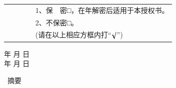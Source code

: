 {{            \vspace*{1cm}
            \begin{center}\hei\xiaoer{\@authorizedtitle}\end{center}\par
            \vspace{1.2\baselineskip}
            \song{}\par
            \song{}\par
            \begin{tabular}{lll}
                \qquad\qquad& \qquad\quad\qquad&\ \ \ \ 1、保　密□，在\underline{\qquad\qquad}年解密后适用于本授权书。 \\
                \qquad\qquad& \qquad\quad\qquad&\ \ \ \ 2、不保密□。                                       \\
                \qquad\qquad& \qquad\quad\qquad&\ \ \ \ (请在以上相应方框内打``$\surd$'')
            \end{tabular}
            \par
            \vspace{2\baselineskip}
            \song\xiaosi
            \@studentsign \makebox[3cm][s]{} \qquad\qquad  
            \makebox[0.5cm][s]{} 年 \makebox[0.5cm][s]{} 月 \makebox[0.5cm][s]{} 日 \\
            \indent
            \@teachersign \makebox[3cm][s]{} \qquad\qquad  
            \makebox[0.5cm][s]{} 年 \makebox[0.5cm][s]{} 月 \makebox[0.5cm][s]{} 日
        }
        \clearpage

         {
            \begin{center}
                \hei\xiaoer{\@title}
            \end{center}\par
            \vspace{0.5\baselineskip}
            \begin{center}
                \hei\xiaoer\ 摘\qquad 要
            \end{center}\par
            \vspace{0.5\baselineskip}
            \song{}\@cabstract
            \vspace{\baselineskip}
            \hangindent=52.3pt\noindent
            \newline\noindent
            {\hei{} \hei\xiaosi\@ckeywords}
        }
        \clearpage
        
}
